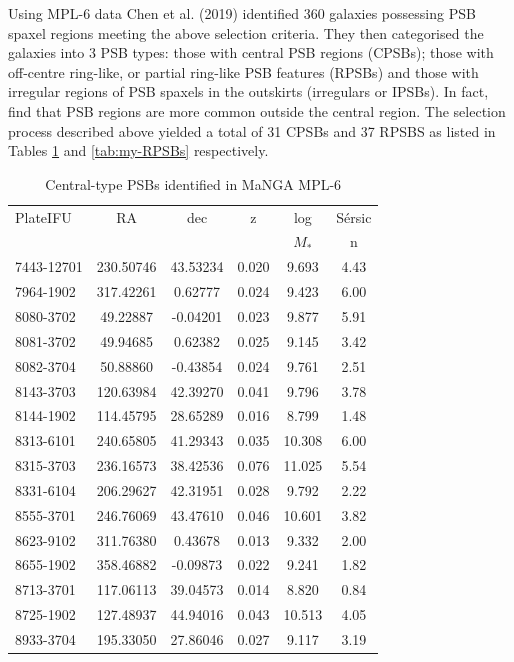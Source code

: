 Using MPL-6 data Chen et al. (2019) identified 360 galaxies possessing PSB spaxel regions meeting the above selection criteria. They then categorised the galaxies into 3 PSB types: those with central PSB regions (CPSBs); those with off-centre ring-like, or partial ring-like PSB features (RPSBs) and those with irregular regions of  PSB spaxels in the outskirts (irregulars or IPSBs). In fact, \citet{2018MNRAS.480.2544R} find that PSB regions are more common outside the central region. The selection process described above yielded a total of 31 CPSBs and 37 RPSBS as listed in Tables \ref{tab:my-CPSBs} and \ref{tab:my-RPSBs} respectively.

\begin{table}
\caption{Central-type PSBs identified in MaNGA MPL-6}
\label{tab:my-CPSBs}
\begin{tabular}{lccccc}
\hline
PlateIFU & RA & dec & z & log & S\'ersic\\
& & & & $M_*$ & n \\
\hline
7443-12701 & 230.50746 & 43.53234 & 0.020 & 9.693 & 4.43 \\
7964-1902 & 317.42261 & 0.62777 & 0.024 & 9.423 & 6.00 \\
8080-3702 & 49.22887 & -0.04201 & 0.023 & 9.877 & 5.91 \\
8081-3702 & 49.94685 & 0.62382 & 0.025 & 9.145 & 3.42 \\
8082-3704 & 50.88860 & -0.43854 & 0.024 & 9.761 & 2.51 \\
8143-3703 & 120.63984 & 42.39270 & 0.041 & 9.796 & 3.78 \\
8144-1902 & 114.45795 & 28.65289 & 0.016 & 8.799 & 1.48 \\
8313-6101 & 240.65805 & 41.29343 & 0.035 & 10.308 & 6.00 \\
8315-3703 & 236.16573 & 38.42536 & 0.076 & 11.025 & 5.54 \\
8331-6104 & 206.29627 & 42.31951 & 0.028 & 9.792 & 2.22 \\
8555-3701 & 246.76069 & 43.47610 & 0.046 & 10.601 & 3.82 \\
8623-9102 & 311.76380 & 0.43678 & 0.013 & 9.332 & 2.00 \\
8655-1902 & 358.46882 & -0.09873 & 0.022 & 9.241 & 1.82 \\
8713-3701 & 117.06113 & 39.04573 & 0.014 & 8.820 & 0.84 \\
8725-1902 & 127.48937 & 44.94016 & 0.043 & 10.513 & 4.05 \\
8933-3704 & 195.33050 & 27.86046 & 0.027 & 9.117 & 3.19 \\

\end{tabular}
\end{table}
